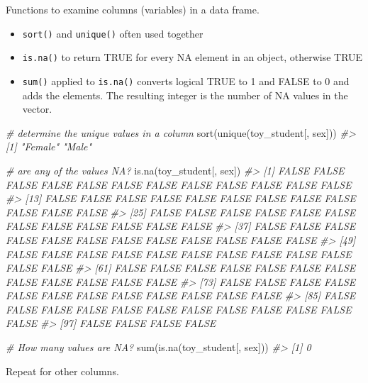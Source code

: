 \documentclass[
]{book}
\newenvironment{Shaded}{\begin{snugshade}}{\end{snugshade}}
\newcommand{\CommentTok}[1]{\textcolor[rgb]{0.56,0.35,0.01}{\textit{#1}}}
\newcommand{\FunctionTok}[1]{\textcolor[rgb]{0.00,0.00,0.00}{#1}}
\newcommand{\NormalTok}[1]{#1}
\providecommand{\tightlist}{%
  \setlength{\itemsep}{0pt}\setlength{\parskip}{0pt}}
\begin{document}
Functions to examine columns (variables) in a data frame.

\begin{itemize}
\tightlist
\item
  \texttt{sort()} and \texttt{unique()} often used together
\item
  \texttt{is.na()} to return TRUE for every NA element in an object, otherwise TRUE
\item
  \texttt{sum()} applied to \texttt{is.na()} converts logical TRUE to 1 and FALSE to 0 and adds the elements. The resulting integer is the number of NA values in the vector.
\end{itemize}

\begin{Shaded}
\begin{Highlighting}[]
\CommentTok{\# determine the unique values in a column }
\FunctionTok{sort}\NormalTok{(}\FunctionTok{unique}\NormalTok{(toy\_student[, sex]))}
\CommentTok{\#\textgreater{} [1] "Female" "Male"}

\CommentTok{\# are any of the values NA?}
\FunctionTok{is.na}\NormalTok{(toy\_student[, sex])}
\CommentTok{\#\textgreater{}   [1] FALSE FALSE FALSE FALSE FALSE FALSE FALSE FALSE FALSE FALSE FALSE FALSE}
\CommentTok{\#\textgreater{}  [13] FALSE FALSE FALSE FALSE FALSE FALSE FALSE FALSE FALSE FALSE FALSE FALSE}
\CommentTok{\#\textgreater{}  [25] FALSE FALSE FALSE FALSE FALSE FALSE FALSE FALSE FALSE FALSE FALSE FALSE}
\CommentTok{\#\textgreater{}  [37] FALSE FALSE FALSE FALSE FALSE FALSE FALSE FALSE FALSE FALSE FALSE FALSE}
\CommentTok{\#\textgreater{}  [49] FALSE FALSE FALSE FALSE FALSE FALSE FALSE FALSE FALSE FALSE FALSE FALSE}
\CommentTok{\#\textgreater{}  [61] FALSE FALSE FALSE FALSE FALSE FALSE FALSE FALSE FALSE FALSE FALSE FALSE}
\CommentTok{\#\textgreater{}  [73] FALSE FALSE FALSE FALSE FALSE FALSE FALSE FALSE FALSE FALSE FALSE FALSE}
\CommentTok{\#\textgreater{}  [85] FALSE FALSE FALSE FALSE FALSE FALSE FALSE FALSE FALSE FALSE FALSE FALSE}
\CommentTok{\#\textgreater{}  [97] FALSE FALSE FALSE FALSE}

\CommentTok{\# How many values are NA?}
\FunctionTok{sum}\NormalTok{(}\FunctionTok{is.na}\NormalTok{(toy\_student[, sex]))}
\CommentTok{\#\textgreater{} [1] 0}
\end{Highlighting}
\end{Shaded}

Repeat for other columns.
\end{document}
